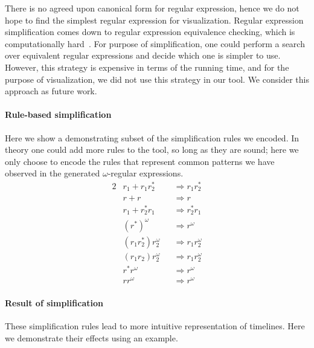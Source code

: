 \documentclass[conference]{IEEEtran}
\theoremstyle{definition}
\theoremstyle{remark}
\begin{document}
There is no agreed upon canonical form for regular expression, hence we do not hope to find the simplest regular expression for visualization. Regular expression simplification comes down to regular expression equivalence checking, which is computationally hard~\cite{MNS04}. For purpose of simplification, one could perform a search over equivalent regular expressions and decide which one is simpler to use. However, this strategy is expensive in terms of the running time, and for the purpose of visualization, we did not use this strategy in our tool. We consider this approach as future work.

\paragraph*{Rule-based simplification}
Here we show a demonstrating subset of the simplification rules we encoded. In theory one could add more rules to the tool, so long as they are sound; here we only choose to encode the rules that represent common patterns we have observed in the generated $\omega$-regular expressions.
\begin{alignat*}{2}
        & r_1 + r_1r_2^* && \Longrightarrow r_1r_2^* \\
        & r + r && \Longrightarrow r \\
        & r_1 + r_2^*r_1 && \Longrightarrow r_2^*r_1 \\
        & (r^*)^{\omega} && \Longrightarrow r^{\omega} \\
        & (r_1r_2^*)r_2^{\omega} && \Longrightarrow r_1r_2^{\omega} \\
        & (r_1r_2)r_2^{\omega} && \Longrightarrow r_1r_2^{\omega} \\
        & r^*r^{\omega} && \Longrightarrow r^{\omega} \\
        & rr^{\omega} && \Longrightarrow r^{\omega}
\end{alignat*}

\paragraph*{Result of simplification}
These simplification rules lead to more intuitive representation of timelines. Here we demonstrate their effects using an example.
\end{document}
